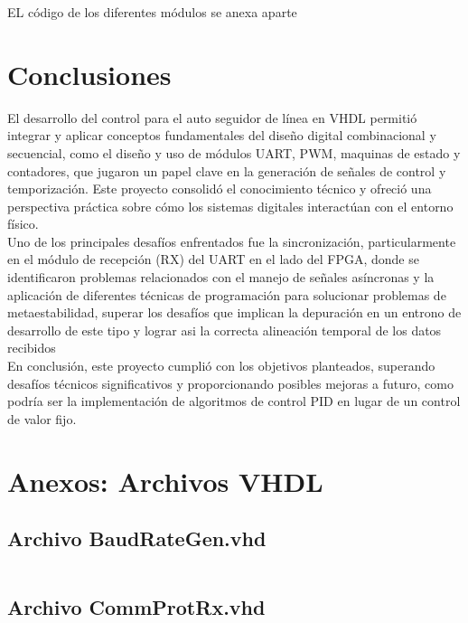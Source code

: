 \documentclass[12pt]{article}
\begin{document}
EL código de los diferentes módulos se anexa aparte

\newpage
\section{Conclusiones}
El desarrollo del control para el auto seguidor de línea en VHDL permitió integrar y aplicar conceptos fundamentales del diseño digital combinacional y secuencial, como el diseño y uso de módulos UART, PWM, maquinas de estado y contadores, que jugaron un papel clave en la generación de señales de control y temporización. Este proyecto consolidó el conocimiento técnico y ofreció una perspectiva práctica sobre cómo los sistemas digitales interactúan con el entorno físico.
\\

Uno de los principales desafíos enfrentados fue la sincronización, particularmente en el módulo de recepción (RX) del UART en el lado del FPGA, donde se identificaron problemas relacionados con el manejo de señales asíncronas y la aplicación de diferentes técnicas de programación para solucionar problemas de metaestabilidad, superar los desafíos que implican la depuración en un entrono de desarrollo de este tipo y lograr asi la correcta alineación temporal de los datos recibidos
\\

En conclusión, este proyecto cumplió con los objetivos planteados, superando desafíos técnicos significativos y proporcionando posibles mejoras a futuro, como podría ser la implementación de algoritmos de control PID en lugar de un control de valor fijo.

\newpage
{}

\section{Anexos: Archivos VHDL}

\subsection{Archivo \textbf{BaudRateGen.vhd}}
\inputminted[bgcolor=bgcodecolor,xleftmargin=20pt,breaklines,linenos,fontsize=\scriptsize]{vhdl}{../GHDL/BaudRateGen.vhd}
\newpage

\subsection{Archivo \textbf{CommProtRx.vhd}}
\inputminted[bgcolor=bgcodecolor,xleftmargin=20pt,breaklines,linenos,fontsize=\scriptsize]{vhdl}{../GHDL/CommProtRx.vhd}
\newpage
\end{document}
